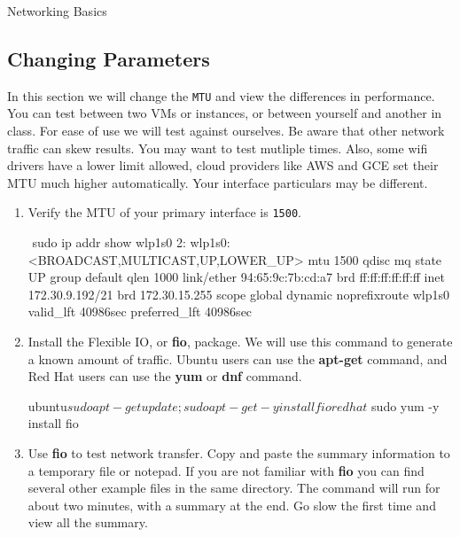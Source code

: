 \begin{Lab}
\begin{exe} {Networking Basics}
	\subsection*{Changing Parameters}
   In this section we will change the \verb:MTU: and view
	the differences in performance. You can test between 
	two VMs or instances, or between yourself and another
	in class. For ease of use we will test against ourselves.
	Be aware that other network traffic can
	skew results. You may want to test mutliple times.
	Also, some wifi drivers have a lower limit allowed,
	cloud providers like AWS and GCE set their MTU much
	higher automatically. Your
	interface particulars may be different. 
	\begin{enumerate}
		\item Verify the MTU of your primary interface 
			is \verb:1500:.
			\begin{raw}
$ $ sudo ip addr show wlp1s0 
2: wlp1s0: <BROADCAST,MULTICAST,UP,LOWER_UP> mtu 1500 qdisc mq 
  state UP group default qlen 1000
    link/ether 94:65:9c:7b:cd:a7 brd ff:ff:ff:ff:ff:ff
    inet 172.30.9.192/21 brd 172.30.15.255 scope global dynamic 
  noprefixroute wlp1s0
       valid_lft 40986sec preferred_lft 40986sec

			\end{raw}
		\item Install the Flexible IO, or \textbf{fio}, package.
			We will use this command to generate a 
			known amount of traffic. Ubuntu users can use
			the \textbf{apt-get} command, and Red Hat users
			can use the \textbf{yum} or \textbf{dnf} 
			command.
			\begin{raw}
ubuntu$ sudo apt-get update ; sudo apt-get -y install fio

redhat$ sudo yum -y install fio
			\end{raw}
		\item
			Use \textbf{fio} to test network transfer. 
			Copy and paste the summary information to 
			a temporary file or notepad. If you are not
			familiar with \textbf{fio} you can find 
			several other example files in the same 
			directory. The command will run for about
			two minutes, with a summary at the end. Go
			slow the first time and view all the summary.


\end{enumerate}
\end{exe}
\end{Lab}
